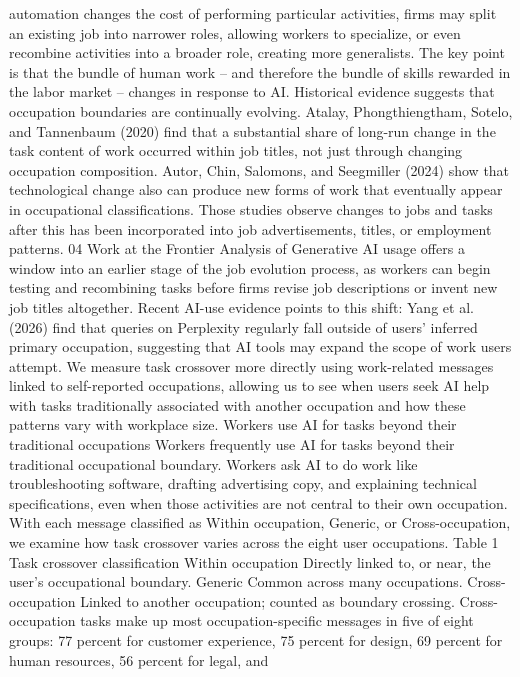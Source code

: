 automation changes the cost of performing particular activities, firms may split an existing job into
narrower roles, allowing workers to specialize, or even recombine activities into a broader role, creating
more generalists. The key point is that the bundle of human work – and therefore the bundle of skills
rewarded in the labor market – changes in response to AI.
Historical evidence suggests that occupation boundaries are continually evolving. Atalay, Phongthiengtham,
Sotelo, and Tannenbaum (2020) find that a substantial share of long-run change in the task content of
work occurred within job titles, not just through changing occupation composition. Autor, Chin,
Salomons, and Seegmiller (2024) show that technological change also can produce new forms of work
that eventually appear in occupational classifications. Those studies observe changes to jobs and tasks
after this has been incorporated into job advertisements, titles, or employment patterns.
04
Work at the Frontier
Analysis of Generative AI usage offers a window into an earlier stage of the job evolution process, as
workers can begin testing and recombining tasks before firms revise job descriptions or invent new
job titles altogether. Recent AI-use evidence points to this shift: Yang et al. (2026) find that queries
on Perplexity regularly fall outside of users’ inferred primary occupation, suggesting that AI tools may
expand the scope of work users attempt. We measure task crossover more directly using work-related
messages linked to self-reported occupations, allowing us to see when users seek AI help with tasks
traditionally associated with another occupation and how these patterns vary with workplace size.
Workers use AI for tasks beyond their
traditional occupations
Workers frequently use AI for tasks beyond their traditional occupational boundary. Workers ask AI to
do work like troubleshooting software, drafting advertising copy, and explaining technical specifications,
even when those activities are not central to their own occupation.
With each message classified as Within occupation, Generic, or Cross-occupation, we examine how task
crossover varies across the eight user occupations.
Table 1
Task crossover classification
Within occupation
Directly linked to, or near, the user’s occupational boundary.
Generic
Common across many occupations.
Cross-occupation
Linked to another occupation; counted as boundary crossing.
Cross-occupation tasks make up most occupation-specific messages in five of eight groups: 77 percent
for customer experience, 75 percent for design, 69 percent for human resources, 56 percent for legal, and
